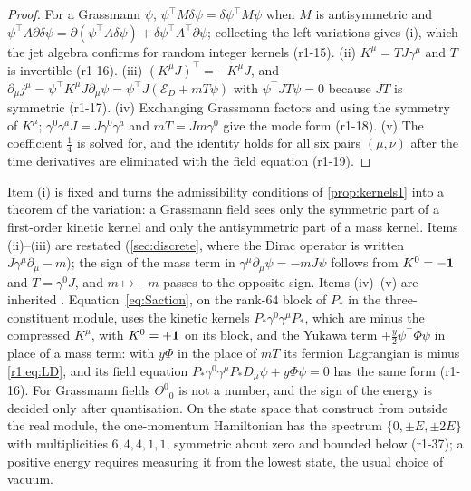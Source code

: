 \begin{proof}
For a Grassmann $\psi$, $\psi^{\!\top}M\delta\psi=\delta\psi^{\!\top}M\psi$ when $M$ is antisymmetric and $\psi^{\!\top}A\partial\delta\psi=
\partial(\psi^{\!\top}A\delta\psi)+\delta\psi^{\!\top}A^{\!\top}\partial\psi$; collecting the left variations gives (i), which the jet algebra
confirms for random integer kernels (r1-15). (ii) $K^\mu=TJ\gamma^\mu$ and $T$ is invertible (r1-16). (iii) $(K^\mu J)^{\!\top}=-K^\mu J$,
and $\partial_\mu j^\mu=\psi^{\!\top}K^\mu J\partial_\mu\psi=\psi^{\!\top}J(\mathcal E_D+mT\psi)$ with $\psi^{\!\top}JT\psi=0$ because $JT$ is
symmetric (r1-17). (iv) Exchanging Grassmann factors and using the symmetry of $K^\mu$;
$\gamma^0\gamma^aJ=J\gamma^0\gamma^a$ and $mT=Jm\gamma^0$ give the mode form (r1-18). (v) The coefficient $\tfrac14$ is solved
for, and the identity holds for all six pairs $(\mu,\nu)$ after the time derivatives are eliminated with the field equation (r1-19).
\end{proof}

Item (i) is fixed and turns the admissibility conditions of \cref{prop:kernels1} into a theorem of the variation: a Grassmann field
sees only the symmetric part of a first-order kinetic kernel and only the antisymmetric part of a mass kernel. Items (ii)--(iii) are
restated (\cref{sec:discrete}, where the Dirac operator is written $J\gamma^\mu\partial_\mu-m$); the sign of the mass term in
$\gamma^\mu\partial_\mu\psi=-mJ\psi$ follows from $K^0=-\mathbf 1$ and $T=\gamma^0J$, and $m\mapsto-m$ passes to the opposite sign. Items
(iv)--(v) are inherited \cite{Belinfante40,WeinbergQFT}. Equation~\cref{eq:Saction}, on the rank-$64$ block of $P_*$ in the
three-constituent module, uses the kinetic kernels $P_*\gamma^0\gamma^\mu P_*$, which are minus the compressed $K^\mu$, with $K^0=+\mathbf 1$ on its
block, and the Yukawa term $+\tfrac y2\psi^{\!\top}\Phi\psi$ in place of a mass term: with $y\Phi$ in the place of $mT$ its fermion Lagrangian is
minus \eqref{r1:eq:LD}, and its field equation $P_*\gamma^0\gamma^\mu P_*D_\mu\psi+y\Phi\psi=0$ has the same form (r1-16). For Grassmann
fields $\Theta^0{}_0$ is not a number, and the sign of the energy is decided only after quantisation. On the state space that
 construct from outside the real module, the one-momentum Hamiltonian has the spectrum
$\{0,\pm E,\pm2E\}$ with multiplicities $6,4,4,1,1$, symmetric about zero and bounded below (r1-37); a positive energy requires measuring
it from the lowest state, the usual choice of vacuum.

